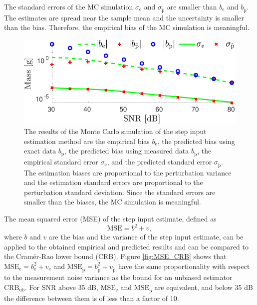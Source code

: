 The standard errors of the MC simulation $\sigma_\mathrm{e}$ and $\sigma_{\widetilde{\mathrm{p}}}$ are smaller than  $b_\mathrm{e}$ and $b_{\widetilde{\mathrm{p}}}$.
The estimates are spread near the sample mean and the uncertainty is smaller than the bias. 
Therefore, the empirical bias of the MC simulation is meaningful.

\begin{figure}[!htb]
\centering
\includegraphics[width=1.0\columnwidth]{./ChapterExperimentalValidation/fig/Fig_2.pdf} 
\caption{ \label{bias_sigma_sim_unstr_str_n2} 
The results of the Monte Carlo simulation of the step input estimation method are the empirical bias $b_{\mathrm{e}}$, the predicted bias using exact data $b_{\mathrm{p}}$, the predicted bias using measured data $b_{\widetilde{\mathrm{p}}}$, the empirical standard error $\sigma_{\mathrm{e}}$, and the predicted standard error $\sigma_{\widetilde{\mathrm{p}}}$. The estimation biases are proportional to the perturbation variance and the estimation standard errors are proportional to the perturbation standard deviation. Since the standard errors are smaller than the biases, the MC simulation is meaningful.  }
\end{figure}

The mean squared error (MSE) of the step input estimate, defined as
\begin{equation} \mathrm{MSE} = b^2 + v,   \end{equation}
where $b$ and $v$ are the bias and the variance of the step input estimate, can be applied to the obtained empirical and predicted results and can be compared to the Cram\'er-Rao lower bound (CRB).
Figure \ref{fig:MSE_CRB} shows that $\mathrm{MSE}_\mathrm{e} = b_\mathrm{e}^2 + v_\mathrm{e}$ and $\mathrm{MSE}_{\widetilde{\mathrm{p}}}  = b_{\widetilde{\mathrm{p}}}^2 + v_{\widetilde{\mathrm{p}}}$ have the same proportionality with respect to the measurement noise variance as the bound for an unbiased estimator $\mathrm{CRB_{ub}}$.
For SNR above 35 dB, $\mathrm{MSE}_\mathrm{e}$ and $\mathrm{MSE}_{\widetilde{\mathrm{p}}}$ are equivalent, and below 35 dB the difference between them is of less than a factor of 10.

